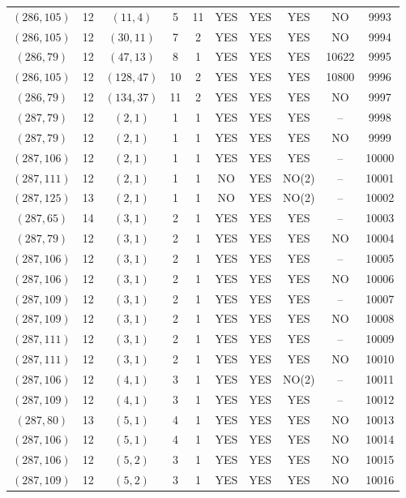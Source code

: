 \begin{longtable}{|c|c|c|c|c|c|c|c|c|c|}
$(286, 105)$ & 12 & $(11, 4)$ & 5 & 11 & YES & YES & YES & NO & 9993\\
$(286, 105)$ & 12 & $(30, 11)$ & 7 & 2 & YES & YES & YES & NO & 9994\\
$(286, 79)$ & 12 & $(47, 13)$ & 8 & 1 & YES & YES & YES & 10622 & 9995\\
$(286, 105)$ & 12 & $(128, 47)$ & 10 & 2 & YES & YES & YES & 10800 & 9996\\
$(286, 79)$ & 12 & $(134, 37)$ & 11 & 2 & YES & YES & YES & NO & 9997\\
$(287, 79)$ & 12 & $(2, 1)$ & 1 & 1 & YES & YES & YES & -- & 9998\\
$(287, 79)$ & 12 & $(2, 1)$ & 1 & 1 & YES & YES & YES & NO & 9999\\
$(287, 106)$ & 12 & $(2, 1)$ & 1 & 1 & YES & YES & YES & -- & 10000\\
$(287, 111)$ & 12 & $(2, 1)$ & 1 & 1 & NO & YES & NO(2) & -- & 10001\\
$(287, 125)$ & 13 & $(2, 1)$ & 1 & 1 & NO & YES & NO(2) & -- & 10002\\
$(287, 65)$ & 14 & $(3, 1)$ & 2 & 1 & YES & YES & YES & -- & 10003\\
$(287, 79)$ & 12 & $(3, 1)$ & 2 & 1 & YES & YES & YES & NO & 10004\\
$(287, 106)$ & 12 & $(3, 1)$ & 2 & 1 & YES & YES & YES & -- & 10005\\
$(287, 106)$ & 12 & $(3, 1)$ & 2 & 1 & YES & YES & YES & NO & 10006\\
$(287, 109)$ & 12 & $(3, 1)$ & 2 & 1 & YES & YES & YES & -- & 10007\\
$(287, 109)$ & 12 & $(3, 1)$ & 2 & 1 & YES & YES & YES & NO & 10008\\
$(287, 111)$ & 12 & $(3, 1)$ & 2 & 1 & YES & YES & YES & -- & 10009\\
$(287, 111)$ & 12 & $(3, 1)$ & 2 & 1 & YES & YES & YES & NO & 10010\\
$(287, 106)$ & 12 & $(4, 1)$ & 3 & 1 & YES & YES & NO(2) & -- & 10011\\
$(287, 109)$ & 12 & $(4, 1)$ & 3 & 1 & YES & YES & YES & -- & 10012\\
$(287, 80)$ & 13 & $(5, 1)$ & 4 & 1 & YES & YES & YES & NO & 10013\\
$(287, 106)$ & 12 & $(5, 1)$ & 4 & 1 & YES & YES & YES & NO & 10014\\
$(287, 106)$ & 12 & $(5, 2)$ & 3 & 1 & YES & YES & YES & NO & 10015\\
$(287, 109)$ & 12 & $(5, 2)$ & 3 & 1 & YES & YES & YES & NO & 10016\\

\end{longtable}
